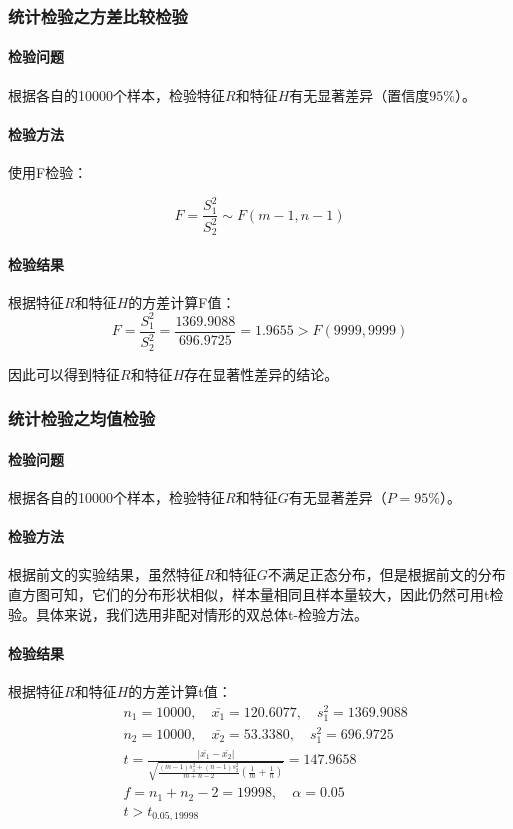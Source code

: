 \documentclass[UTF8]{ctexart}
\begin{document}
	\subsubsection{统计检验之方差比较检验}

	\paragraph{检验问题} 根据各自的10000个样本，检验特征$R$和特征$H$有无显著差异（置信度$95\%$）。
	
	\paragraph{检验方法} 使用F检验：
	
	\begin{equation*}
	F=\frac{S_1^2}{S_2^2} \sim F(m - 1, n - 1)
	\end{equation*}
	
	\paragraph{检验结果} 根据特征$R$和特征$H$的方差计算F值：
	\begin{equation*}
	F=\frac{S_1^2}{S_2^2} = \frac{1369.9088}{696.9725} = 1.9655 > F(9999, 9999)
	\end{equation*}
	
	因此可以得到特征$R$和特征$H$存在显著性差异的结论。
	
	\subsubsection{统计检验之均值检验}
	
	\paragraph{检验问题} 根据各自的10000个样本，检验特征$R$和特征$G$有无显著差异（$P=95\%$）。
	
	\paragraph{检验方法} 根据前文的实验结果，虽然特征$R$和特征$G$不满足正态分布，但是根据前文的分布直方图可知，它们的分布形状相似，样本量相同且样本量较大，因此仍然可用t检验。具体来说，我们选用非配对情形的双总体t-检验方法。
	
	\paragraph{检验结果} 根据特征$R$和特征$H$的方差计算t值：
	\begin{align*}
	& n_1 = 10000, \quad \bar{x_1}=120.6077, \quad s_1^2 = 1369.9088 \\
	& n_2 = 10000, \quad \bar{x_2}=53.3380, \quad s_1^2 = 696.9725 \\
	& t = \frac{|\bar{x_1} - \bar{x_2}|}{\sqrt{\frac{(m - 1)s_1^2 + (n - 1)s_2^2}{m + n - 2}(\frac{1}{m} + \frac{1}{n})}} = 147.9658 \\
	& f = n_1 + n_2 - 2 = 19998, \quad \alpha = 0.05 \\
	& t > t_{0.05, 19998}
	\end{align*}
	
\end{document}

